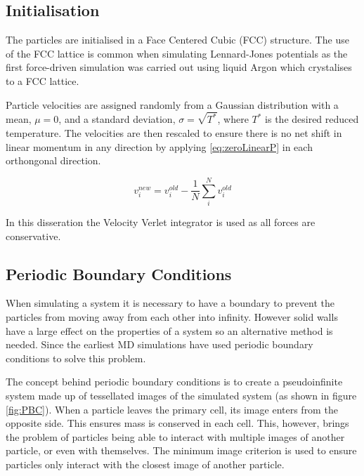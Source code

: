 \documentclass[12pt]{UoAthesis}
\begin{document}
\subsection{Initialisation \label{sec:initMD}} 
The particles are initialised in a Face Centered Cubic (FCC)
 structure. The use of the
FCC lattice is common when simulating Lennard-Jones potentials as the
first force-driven simulation \cite{Rahman1964} was carried out using
liquid Argon which crystalises to a FCC lattice.

Particle velocities are assigned randomly from a Gaussian distribution
with a mean, $\mu = 0$, and a standard deviation, $\sigma =
\sqrt{T^{*}}$, where $T^{*}$ is the desired reduced temperature. The
velocities are then rescaled to ensure there is no net shift in linear
momentum in any direction by applying \eqref{eq:zeroLinearP} in each
orthongonal direction.

\begin{equation} 
  v_{i}^{new} = v_{i}^{old} - \frac{1}{N}
  \sum^{N}_{i}v_{i}^{old}
  \label{eq:zeroLinearP} 
\end{equation}



In this disseration the Velocity Verlet integrator is used as all
forces are conservative.

\subsection{Periodic Boundary Conditions}

When simulating a system it is necessary to have a boundary to prevent
the particles from moving away from each other into infinity.  However
solid walls have a large effect on the properties of a system so an
alternative method is needed.  Since the earliest MD simulations
\cite{Alder1959} have used periodic boundary conditions to solve this
problem.

The concept behind periodic boundary conditions is to create a
pseudoinfinite system made up of tessellated images of the simulated
system (as shown in figure \ref{fig:PBC}).  When a particle leaves the
primary cell, its image enters from the opposite side.  This ensures
mass is conserved in each cell.  This, however, brings the problem of
particles being able to interact with multiple images of another
particle, or even with themselves.  The minimum image criterion is
used to ensure particles only interact with the closest image of
another particle.
\end{document}
